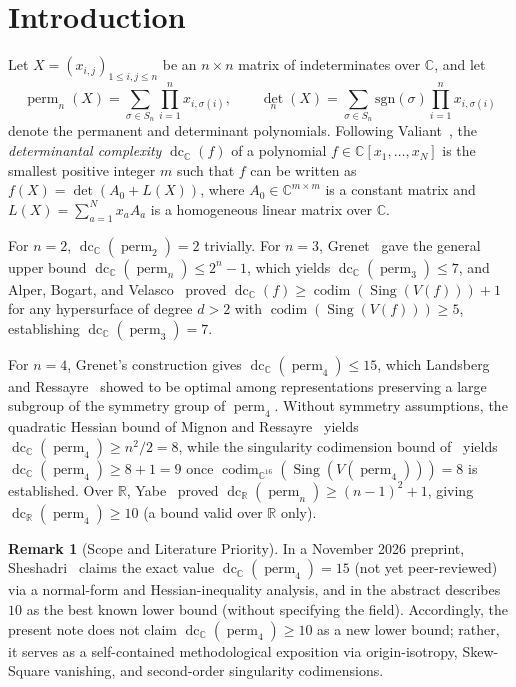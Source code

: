 \documentclass[11pt,a4paper]{article}
\theoremstyle{definition}
\newtheorem{remark}[theorem]{Remark}
\DeclareMathOperator{\perm}{perm}
\DeclareMathOperator{\dc}{dc}
\DeclareMathOperator{\codim}{codim}
\DeclareMathOperator{\Sing}{Sing}
\begin{document}
\section{Introduction}

Let $X = (x_{i,j})_{1 \le i,j \le n}$ be an $n \times n$ matrix of indeterminates over $\mathbb{C}$, and let
\[
  \perm_n(X) = \sum_{\sigma \in S_n} \prod_{i=1}^n x_{i,\sigma(i)}, \qquad
  \det_n(X) = \sum_{\sigma \in S_n} \mathrm{sgn}(\sigma) \prod_{i=1}^n x_{i,\sigma(i)}
\]
denote the permanent and determinant polynomials. Following Valiant~\cite{Valiant1979}, the \emph{determinantal complexity} $\dc_{\mathbb{C}}(f)$ of a polynomial $f \in \mathbb{C}[x_1,\dots,x_N]$ is the smallest positive integer $m$ such that $f$ can be written as $f(X) = \det(A_0 + L(X))$, where $A_0 \in \mathbb{C}^{m\times m}$ is a constant matrix and $L(X) = \sum_{a=1}^N x_a A_a$ is a homogeneous linear matrix over $\mathbb{C}$.

For $n = 2$, $\dc_{\mathbb{C}}(\perm_2) = 2$ trivially. For $n = 3$, Grenet~\cite{Grenet2011} gave the general upper bound $\dc_{\mathbb{C}}(\perm_n) \le 2^n - 1$, which yields $\dc_{\mathbb{C}}(\perm_3) \le 7$, and Alper, Bogart, and Velasco~\cite{ABV2017} proved $\dc_{\mathbb{C}}(f) \ge \codim(\Sing(V(f))) + 1$ for any hypersurface of degree $d > 2$ with $\codim(\Sing(V(f))) \ge 5$, establishing $\dc_{\mathbb{C}}(\perm_3) = 7$.

For $n = 4$, Grenet's construction gives $\dc_{\mathbb{C}}(\perm_4) \le 15$, which Landsberg and Ressayre~\cite{LR2017} showed to be optimal among representations preserving a large subgroup of the symmetry group of $\perm_4$. Without symmetry assumptions, the quadratic Hessian bound of Mignon and Ressayre~\cite{MR2004} yields $\dc_{\mathbb{C}}(\perm_4) \ge n^2/2 = 8$, while the singularity codimension bound of~\cite{ABV2017} yields $\dc_{\mathbb{C}}(\perm_4) \ge 8 + 1 = 9$ once $\codim_{\mathbb{C}^{16}}(\Sing(V(\perm_4))) = 8$ is established. Over $\mathbb{R}$, Yabe~\cite{Yabe2015} proved $\dc_{\mathbb{R}}(\perm_n) \ge (n-1)^2 + 1$, giving $\dc_{\mathbb{R}}(\perm_4) \ge 10$ (a bound valid over $\mathbb{R}$ only).

\begin{remark}[Scope and Literature Priority]
In a November 2026 preprint, Sheshadri~\cite{Sheshadri2026} claims the exact value $\dc_{\mathbb{C}}(\perm_4) = 15$ (not yet peer-reviewed) via a normal-form and Hessian-inequality analysis, and in the abstract describes $10$ as the best known lower bound (without specifying the field). Accordingly, the present note does not claim $\dc_{\mathbb{C}}(\perm_4) \ge 10$ as a new lower bound; rather, it serves as a self-contained methodological exposition via origin-isotropy, Skew-Square vanishing, and second-order singularity codimensions.
\end{remark}
\end{document}
